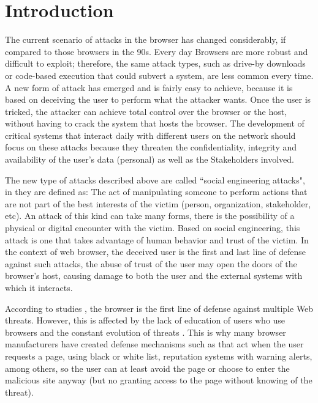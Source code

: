 \documentclass{sig-alternate-05-2015}
\begin{document}





\section{Introduction}
The current scenario of attacks in the browser has changed considerably, if compared to those browsers in the 90s. Every day Browsers are more robust and difficult to exploit; therefore, the same attack types, such as drive-by downloads or code-based execution that could subvert a system, are less common every time. A new form of attack has emerged and is fairly easy to achieve, because it is based on deceiving the user to perform what the attacker wants. Once the user is tricked, the attacker can achieve total control over the browser or the host, without having to crack the system \cite{Rajab2013,Labs2013} that hosts the browser. The development of critical systems that interact daily with different users on the network should focus on these attacks because they threaten the confidentiality, integrity and availability of the user's data (personal) as well as the Stakeholders involved.

The new type of attacks described above are called ``social engineering attacks", in \cite{socEngineeering} they are defined as: The act of manipulating someone to perform actions that are not part of the best interests of the victim (person, organization, stakeholder, etc). An attack of this kind can take many forms, there is the possibility of a physical or digital encounter with the victim. Based on social engineering, this attack is one that takes advantage of human behavior and trust of the victim. In the context of web browser, the deceived user is the first and last line of defense against such attacks, the abuse of trust of the user may open the doors of the browser's host, causing damage to both the user and the external systems with which it interacts.

According to studies \cite{browSecPhish,Labs2013,rowSecSEMBlock}, the browser is the first line of defense against multiple Web threats. However, this is affected by the lack of education of users who use browsers and the constant evolution of threats \cite{browSecPhish}. This is why many browser manufacturers have created defense mechanisms such as \cite{Drake2011} that act when the user requests a page, using black or white list, reputation systems \cite{Rajab2013} with warning alerts, among others, so the user can at least avoid the page or choose to enter the malicious site anyway (but no granting access to the page without knowing of the threat).
\end{document}
